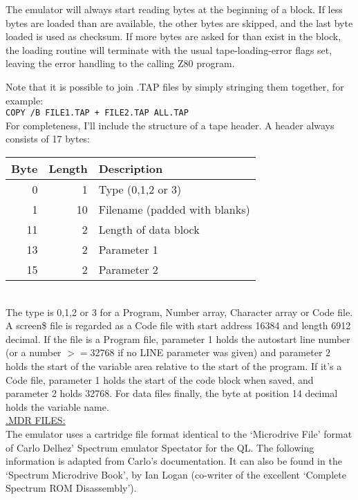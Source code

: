 \noindent
    The emulator will always start reading bytes at the beginning of a
    block.  If less bytes are loaded than are available, the other bytes are
    skipped, and the last byte loaded is used as checksum.  If more bytes
    are asked for than exist in the block, the loading routine will
    terminate with the usual tape-loading-error flags set, leaving the error
    handling to the calling Z80 program.

    Note that it is possible to join .TAP files by simply stringing them
    together, for example:\\

    \verb|COPY /B FILE1.TAP + FILE2.TAP ALL.TAP|\\

\noindent
    For completeness, I'll include the structure of a tape header.  A header
    always consists of 17 bytes:\\

\begin{tabular}{|r|r|l|}
	\hline
        Byte &   Length & Description				\\
	\hline
	\hline
        0    &   1      & Type (0,1,2 or 3)			\\
        1    &   10     & Filename (padded with blanks)		\\
        11   &   2      & Length of data block			\\
        13   &   2      & Parameter 1				\\
        15   &   2      & Parameter 2				\\
	\hline
\end{tabular}\\

\noindent
    The type is 0,1,2 or 3 for a Program, Number array, Character array or
    Code file.  A screen\$ file is regarded as a Code file with start address
    16384 and length 6912 decimal.  If the file is a Program file, parameter
    1 holds the autostart line number (or a number $>=$32768 if no LINE
    parameter was given) and parameter 2 holds the start of the variable
    area relative to the start of the program.  If it's a Code file,
    parameter 1 holds the start of the code block when saved, and parameter
    2 holds 32768.  For data files finally, the byte at position 14 decimal
    holds the variable name.\\

\newpage
\noindent
\underline{.MDR FILES:}\\

    The emulator uses a cartridge file format identical to the `Microdrive
    File' format of Carlo Delhez' Spectrum emulator Spectator for the QL\@.
    The following information is adapted from Carlo's documentation.  It can
    also be found in the `Spectrum Microdrive Book', by Ian Logan (co-writer
    of the excellent `Complete Spectrum ROM Disassembly').

